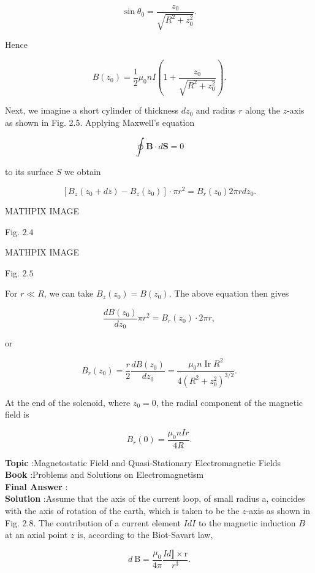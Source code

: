 \documentclass[10pt]{article}
\begin{document}
$$
\sin \theta_{0}=\frac{z_{0}}{\sqrt{R^{2}+z_{0}^{2}}} .
$$

Hence

$$
B\left(z_{0}\right)=\frac{1}{2} \mu_{0} n I\left(1+\frac{z_{0}}{\sqrt{R^{2}+z_{0}^{2}}}\right) .
$$

Next, we imagine a short cylinder of thickness $d z_{0}$ and radius $r$ along the $z$-axis as shown in Fig. 2.5. Applying Maxwell's equation

$$
\oint \mathbf{B} \cdot d \mathbf{S}=0
$$

to its surface $S$ we obtain

$$
\left[B_{z}\left(z_{0}+d z\right)-B_{z}\left(z_{0}\right)\right] \cdot \pi r^{2}=B_{r}\left(z_{0}\right) 2 \pi r d z_{0} .
$$

MATHPIX IMAGE

Fig. $2.4$

MATHPIX IMAGE

Fig. $2.5$

For $r \ll R$, we can take $B_{z}\left(z_{0}\right)=B\left(z_{0}\right)$. The above equation then gives

$$
\frac{d B\left(z_{0}\right)}{d z_{0}} \pi r^{2}=B_{r}\left(z_{0}\right) \cdot 2 \pi r,
$$

or

$$
B_{r}\left(z_{0}\right)=\frac{r}{2} \frac{d B\left(z_{0}\right)}{d z_{0}}=\frac{\mu_{0} n \operatorname{Ir} R^{2}}{4\left(R^{2}+z_{0}^{2}\right)^{3 / 2}} .
$$

At the end of the solenoid, where $z_{0}=0$, the radial component of the magnetic field is

$$
B_{r}(0)=\frac{\mu_{0} n I r}{4 R} .
$$



\textbf{Topic} :Magnetostatic Field and Quasi-Stationary Electromagnetic Fields\\
\textbf{Book} :Problems and Solutions on Electromagnetism\\
\textbf{Final Answer} :\\


\textbf{Solution} :Assume that the axis of the current loop, of small radius a, coincides with the axis of rotation of the earth, which is taken to be the $z$-axis as shown in Fig. 2.8. The contribution of a current element $I d I$ to the magnetic induction $B$ at an axial point $z$ is, according to the Biot-Savart law,

$$
d \mathrm{~B}=\frac{\mu_{0}}{4 \pi} \frac{I d \rrbracket \times \mathrm{r}}{r^{3}} .
$$
\end{document}
